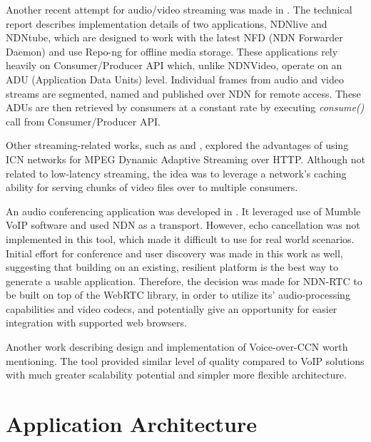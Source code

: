 \documentclass{icn/sig-alternate-2012} %
\newcommand{\ndnrtcName}{NDN-RTC} %
\begin{document}
Another recent attempt for audio/video streaming was made in \cite{ndnlive-tube}. The technical report describes implementation details of two applications, NDNlive and NDNtube, which are designed to work with the latest NFD (NDN Forwarder Daemon) and use Repo-ng \cite{repo-ng} for offline media storage. These applications rely heavily on Consumer/Producer API \cite{cons-prod-api} which, unlike NDNVideo, operate on an ADU (Application Data Units) level. Individual frames from audio and video streams are segmented, named and published over NDN for remote access. These ADUs are then retrieved by consumers at a constant rate by executing \textit{consume()} call from Consumer/Producer API. %

Other streaming-related works, such as \cite{ccn-dash} and \cite{ndn-dash}, explored the advantages of using ICN networks for MPEG Dynamic Adaptive Streaming over HTTP. Although not related to low-latency streaming, the idea was to leverage a network's caching ability for serving chunks of video files over to multiple consumers.

An audio conferencing application was developed in \cite{act-tool}. It leveraged use of Mumble VoIP software and used NDN as a transport. However, echo cancellation was not implemented in this tool, which made it difficult to use for real world scenarios. Initial effort for conference and user discovery was made in this work as well, suggesting that building on an existing, resilient platform is the best way to generate a usable application. Therefore, the decision was made for \ndnrtcName{} to be built on top of the WebRTC library, in order to utilize its' audio-processing capabilities and video codecs, and potentially give an opportunity for easier integration with supported web browsers. 

Another work \cite{voccn} describing design and implementation of Voice-over-CCN worth mentioning. The tool provided similar level of quality compared to VoIP solutions with much greater scalability potential and simpler more flexible architecture.


\section{Application Architecture}
\label{sec:arch}
\end{document}
